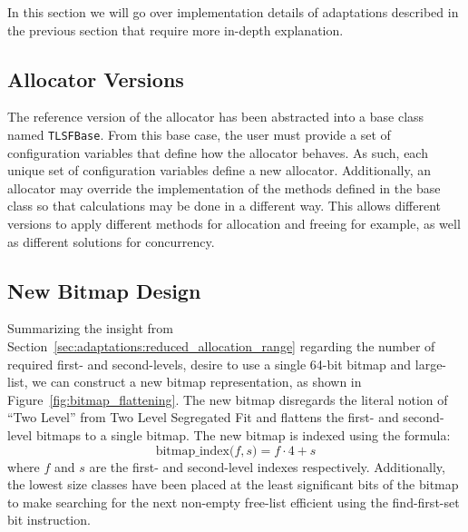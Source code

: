 
In this section we will go over implementation details of adaptations described in the previous section that require more in-depth explanation.

\subsection{Allocator Versions}

The reference version of the allocator has been abstracted into a base class named \texttt{TLSFBase}. From this base case, the user must provide a set of configuration variables that define how the allocator behaves. As such, each unique set of configuration variables define a new allocator. Additionally, an allocator may override the implementation of the methods defined in the base class so that calculations may be done in a different way. This allows different versions to apply different methods for allocation and freeing for example, as well as different solutions for concurrency.

\subsection{New Bitmap Design}

Summarizing the insight from Section~\ref{sec:adaptations:reduced_allocation_range} regarding the number of required first- and second-levels, desire to use a single 64-bit bitmap and large-list, we can construct a new bitmap representation, as shown in Figure~\ref{fig:bitmap_flattening}. The new bitmap disregards the literal notion of ``Two Level'' from Two Level Segregated Fit and flattens the first- and second-level bitmaps to a single bitmap. The new bitmap is indexed using the formula: 
\[
    \text{bitmap\_index($f, s$)} = f \cdot 4 + s
\]
where $f$ and $s$ are the first- and second-level indexes respectively. Additionally, the lowest size classes have been placed at the least significant bits of the bitmap to make searching for the next non-empty free-list efficient using the find-first-set bit instruction.

